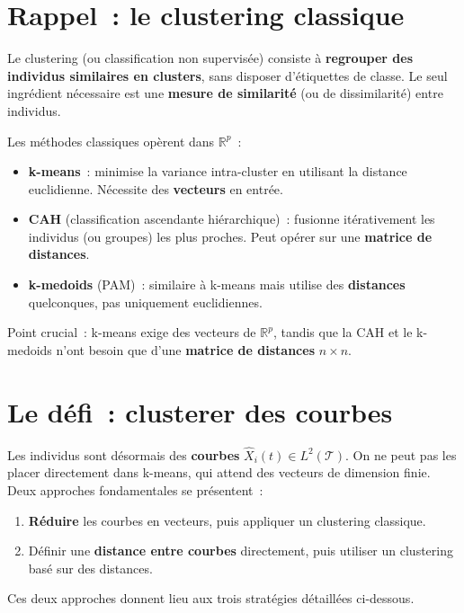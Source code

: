 \documentclass[11pt, a4paper]{article}
\newcommand{\R}{\mathbb{R}}
\newcommand{\Ltwo}{L^2(\mathcal{T})}
\begin{document}
\section{Rappel~: le clustering classique}

Le clustering (ou classification non supervis\'ee) consiste \`a \textbf{regrouper des individus similaires en clusters}, sans disposer d'\'etiquettes de classe. Le seul ingr\'edient n\'ecessaire est une \textbf{mesure de similarit\'e} (ou de dissimilarit\'e) entre individus.

Les m\'ethodes classiques op\`erent dans $\R^p$~:
\begin{itemize}[nosep]
    \item \textbf{k-means}~: minimise la variance intra-cluster en utilisant la distance euclidienne. N\'ecessite des \textbf{vecteurs} en entr\'ee.
    \item \textbf{CAH} (classification ascendante hi\'erarchique)~: fusionne it\'erativement les individus (ou groupes) les plus proches. Peut op\'erer sur une \textbf{matrice de distances}.
    \item \textbf{k-medoids} (PAM)~: similaire \`a k-means mais utilise des \textbf{distances} quelconques, pas uniquement euclidiennes.
\end{itemize}

Point crucial~: k-means exige des vecteurs de $\R^p$, tandis que la CAH et le k-medoids n'ont besoin que d'une \textbf{matrice de distances} $n \times n$.

\section{Le d\'efi~: clusterer des courbes}

Les individus sont d\'esormais des \textbf{courbes} $\hat{X}_i(t) \in \Ltwo$. On ne peut pas les placer directement dans k-means, qui attend des vecteurs de dimension finie. Deux approches fondamentales se pr\'esentent~:
\begin{enumerate}[nosep]
    \item \textbf{R\'eduire} les courbes en vecteurs, puis appliquer un clustering classique.
    \item D\'efinir une \textbf{distance entre courbes} directement, puis utiliser un clustering bas\'e sur des distances.
\end{enumerate}

Ces deux approches donnent lieu aux trois strat\'egies d\'etaill\'ees ci-dessous.
\end{document}
